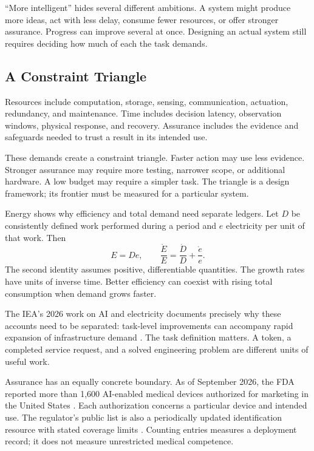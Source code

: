 \documentclass[11pt,openany]{book}
\begin{document}
“More intelligent” hides several different ambitions. A system might produce more ideas, act with less delay, consume fewer resources, or offer stronger assurance. Progress can improve several at once. Designing an actual system still requires deciding how much of each the task demands.

\subsection{A Constraint Triangle}

Resources include computation, storage, sensing, communication, actuation, redundancy, and maintenance. Time includes decision latency, observation windows, physical response, and recovery. Assurance includes the evidence and safeguards needed to trust a result in its intended use.

These demands create a constraint triangle. Faster action may use less evidence. Stronger assurance may require more testing, narrower scope, or additional hardware. A low budget may require a simpler task. The triangle is a design framework; its frontier must be measured for a particular system.

Energy shows why efficiency and total demand need separate ledgers. Let $D$ be consistently defined work performed during a period and $e$ electricity per unit of that work. Then
\begin{equation}
 E=De,\qquad
 \frac{\dot E}{E}=\frac{\dot D}{D}+\frac{\dot e}{e}.
\end{equation}
The second identity assumes positive, differentiable quantities. The growth rates have units of inverse time. Better efficiency can coexist with rising total consumption when demand grows faster.

The IEA's 2026 work on AI and electricity documents precisely why these accounts need to be separated: task-level improvements can accompany rapid expansion of infrastructure demand \cite{iea2026questions,iea2026powering}. The task definition matters. A token, a completed service request, and a solved engineering problem are different units of useful work.

Assurance has an equally concrete boundary. As of September 2026, the FDA reported more than 1,600 AI-enabled medical devices authorized for marketing in the United States \cite{fda2026aidevices}. Each authorization concerns a particular device and intended use. The regulator's public list is also a periodically updated identification resource with stated coverage limits \cite{fda2026ailist}. Counting entries measures a deployment record; it does not measure unrestricted medical competence.
\end{document}
